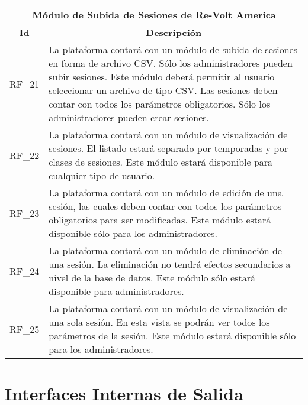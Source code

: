 \begin{center}
	\begin{tabular}{ | l | p{15cm} |}
		\hline
		\multicolumn{2}{|c|}{\textbf{Módulo de Subida de Sesiones de Re-Volt America}} \\
		\hline
		\multicolumn{1}{|c|}{\textbf{Id}} & \multicolumn{1}{|c|}{\textbf{Descripción}} \\
		\hline
		RF\_21 & La plataforma contará con un módulo de subida de sesiones en forma de archivo CSV. Sólo los administradores pueden subir sesiones. Este módulo deberá permitir al usuario seleccionar un archivo de tipo CSV. Las sesiones deben contar con todos los parámetros obligatorios. Sólo los administradores pueden crear sesiones. \\ \hline
		
		RF\_22 & La plataforma contará con un módulo de visualización de sesiones. El listado estará separado por temporadas y por clases de sesiones. Este módulo estará disponible para cualquier tipo de usuario. \\ \hline
		
		RF\_23 & La plataforma contará con un módulo de edición de una sesión, las cuales deben contar con todos los parámetros obligatorios para ser modificadas. Este módulo estará disponible sólo para los administradores. \\ \hline
		
		RF\_24 & La plataforma contará con un módulo de eliminación de una sesión. La eliminación no tendrá efectos secundarios a nivel de la base de datos. Este módulo sólo estará disponible para administradores. \\ \hline
		
		RF\_25 & La plataforma contará con un módulo de visualización de una sola sesión. En esta vista se podrán ver todos los parámetros de la sesión. Este módulo estará disponible sólo para los administradores. \\ \hline
	\end{tabular}
\end{center}

\section{Interfaces Internas de Salida}


